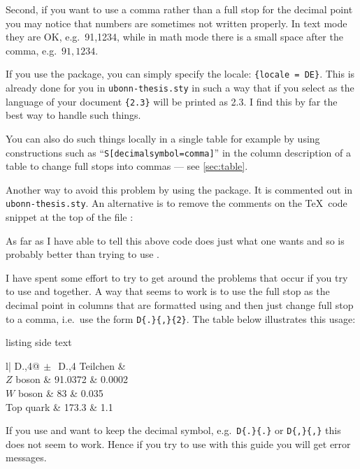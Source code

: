 Second, if you want to use a comma rather than a full stop for the
decimal point you may notice that numbers are sometimes not written
properly. In text mode they are OK, e.g.\ 91,1234, while in math mode
there is a small space after the comma, e.g.\ \(91,1234\).

If you use the  package, you can simply specify the
locale: \texttt{\{locale = DE\}}. This is already done
for you in \texttt{ubonn-thesis.sty} in such a way that if you
select  as the language of your document
\texttt{\{2.3\}} will be printed as \num[locale=DE]{2.3}. I find this
by far the best way to handle such things.

You can also do such things locally in a
single table for example by using constructions such as
\enquote{\texttt{S[decimalsymbol=comma]}} in the column description of a table to
change full stops into commas --- see \cref{sec:table}.

Another way to avoid this problem by using the  package. It is
commented out in \texttt{ubonn-thesis.sty}. An alternative
is to remove the comments on the \TeX\ code snippet at the top
of the file :
As far as I have able to tell this above code does just what one wants
and so is probably better than trying to use .

I have spent some effort to try to get around the problems that occur
if you try to use  and  together. A way
that seems to work is to use the full stop as the decimal point in
columns that are formatted using  and then just change
full stop to a comma, i.e.\ use the form \verb+D{.}{,}{2}+. The table
below illustrates this usage:
\begin{tcblisting}{listing side text}
\begin{otherlanguage}{ngerman}
\begin{tabular}{l|
  D{.}{,}{4}@{\(\,\pm\,\)}
  D{.}{,}{4}}
  Teilchen & \\
  \midrule
  \(Z\) boson & 91.0372 & 0.0002\\
  \(W\) boson & 83 & 0.035\\
  Top quark & 173.3 & 1.1\\
\end{tabular}
\end{otherlanguage}
\end{tcblisting}
If you use  and want to keep the decimal symbol,
e.g.\ \verb+D{.}{.}+ or \verb+D{,}{,}+ this does
not seem to work. Hence if you try to use  with this
guide you will get error messages.

